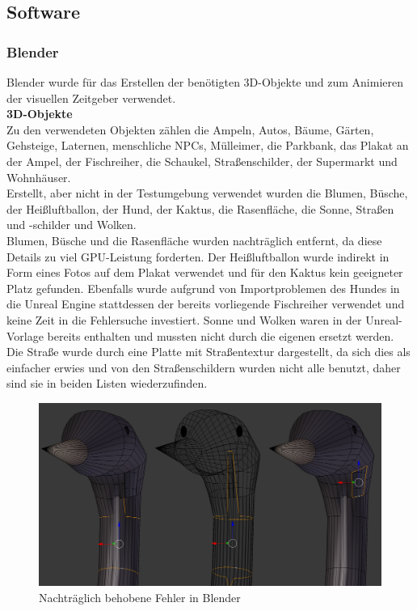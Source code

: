 \documentclass{Bericht}
\begin{document}
\subsection{Software}
\subsubsection{Blender}
Blender wurde für das Erstellen der benötigten 3D-Objekte und zum Animieren der visuellen Zeitgeber verwendet.\\

\textbf{3D-Objekte}\\
Zu den verwendeten Objekten zählen die Ampeln, Autos, Bäume, Gärten, Gehsteige, Laternen, menschliche NPCs, Mülleimer, die Parkbank, das Plakat an der Ampel, der Fischreiher, die Schaukel, Straßenschilder, der Supermarkt und Wohnhäuser.\\
 Erstellt, aber nicht in der Testumgebung verwendet wurden die Blumen, Büsche, der Heißluftballon, der Hund, der Kaktus, die Rasenfläche, die Sonne, Straßen und -schilder und Wolken.\\
		Blumen, Büsche und die Rasenfläche wurden nachträglich entfernt, da diese Details zu viel GPU-Leistung forderten. Der Heißluftballon wurde indirekt in Form eines Fotos auf dem Plakat verwendet und für den Kaktus kein geeigneter Platz gefunden. Ebenfalls wurde aufgrund von Importproblemen des Hundes in die Unreal Engine stattdessen der bereits vorliegende Fischreiher verwendet und keine Zeit in die Fehlersuche investiert.
 		Sonne und Wolken waren in der Unreal-Vorlage bereits enthalten und mussten nicht durch die eigenen ersetzt werden. 
		Die Straße wurde durch eine Platte mit Straßentextur dargestellt, da sich dies als einfacher erwies und von den Straßenschildern wurden nicht alle benutzt, daher sind sie in beiden Listen wiederzufinden.\\
		
		
	

		\begin{figure}[H] %
			\centering
			\includegraphics[height=\textheight, width=\linewidth, keepaspectratio, angle=0]{../Bilder/Heron_Problem.png} %
			\caption{Nachträglich behobene Fehler in Blender}
			\label{img:heron-error}
		\end{figure}
\end{document}
